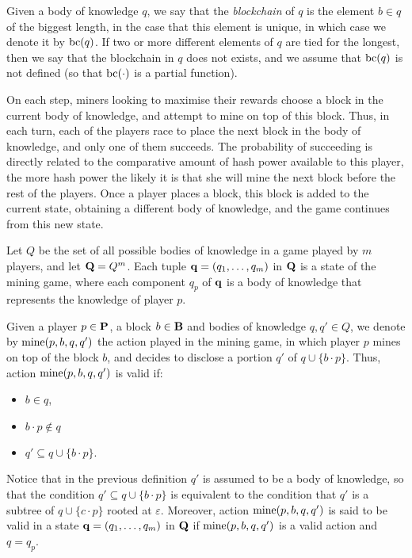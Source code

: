 Given a body of knowledge $q$, we say that the {\em blockchain} of $q$ is the element $b\in q$ of the biggest length, in the case that this element is unique, in which case we denote it by $\text{bc}(q)$. If two or more different elements of $q$ are tied for the longest, then we say that the blockchain in $q$ does not exists, and we assume that $\text{bc}(q)$ is not defined (so that $\text{bc}(\cdot)$ is a partial function).

On each step, miners looking to maximise their rewards choose a block in the current body of knowledge, and attempt to mine on top of this block. Thus, in each turn, each of the players race to place the next block in the body of knowledge, and only one of them succeeds. The probability of succeeding is directly related to the comparative amount of hash power available to this player, the more hash power the likely it is that she will mine the next block before the rest of the players. Once a player places a block, this block is added to the current state, obtaining a different body of knowledge, and the game continues from this new state. 

Let $Q$ be the set of all possible bodies of knowledge in a game played by $m$ players, and let $\mathbf{Q} = Q^m$. Each tuple $\mathbf{q} = (q_1, \ldots, q_m)$ in $\mathbf{Q}$ is a state of the mining game, where each component $q_p$ of $\mathbf{q}$ is a body of knowledge that represents the knowledge of player $p$.

Given a player $p \in \mathbf{P}$, a block $b \in \mathbf{B}$ and bodies of knowledge $q, q' \in Q$, we denote by $\text{\rm mine}(p,b,q,q')$ the action played in the mining game, in which player $p$ mines on top of the block $b$, and decides to disclose a portion $q'$ of $q \cup \{b\cdot p\}$. Thus, action $\text{\rm mine}(p,b,q,q')$ is valid if:
\begin{itemize}

\item $b \in q$,


\item $b\cdot p \not\in q$

\item $q' \subseteq q \cup \{b\cdot p\}$.
\end{itemize}


Notice that in the previous definition $q'$ is assumed to be a body of knowledge, so that the condition $q' \subseteq q \cup \{b\cdot p\}$ is equivalent to the condition that $q'$ is a subtree of $q \cup \{c\cdot p\}$ rooted at $\varepsilon$. Moreover, action $\text{\rm mine}(p,b,q,q')$ is said to be valid in a state $\mathbf{q} = (q_1, \ldots, q_m)$ in $\mathbf{Q}$ if $\text{\rm mine}(p,b,q,q')$ is a valid action and $q = q_p$.

